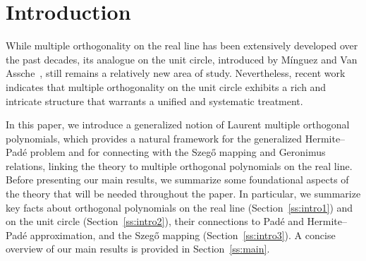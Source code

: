 \documentclass[reqno,centertags,11pt,draft]{amsart}
\newcommand{\blue}[1]{{\color{blue}#1}}
\begin{document}
\section{Introduction}

While multiple orthogonality on the real line has been extensively developed over the past decades, its analogue on the unit circle, introduced by M\'{i}nguez and Van Assche~\cite{MOPUC1}, still remains a relatively new area of study. Nevertheless, recent work~\cite{MOPUC2,KVMOPUC,KVMLOPUC1,KNik,HueMan} indicates that multiple orthogonality on the unit circle exhibits a rich and intricate structure that warrants a unified and systematic treatment.

In this paper, we introduce a generalized notion of Laurent multiple orthogonal polynomials, which provides a natural framework for the generalized Hermite--Pad\'{e} problem and for connecting with the Szeg\H{o} mapping and Geronimus relations, linking the theory to multiple orthogonal polynomials on the real line. Before presenting our main results, we summarize some foundational aspects of the theory that will be needed throughout the paper. In particular, we summarize key facts about orthogonal polynomials on the real line (Section~\ref{ss:intro1}) and on the unit circle  (Section~\ref{ss:intro2}), their connections to Pad\'e and Hermite--Pad\'e approximation, and the Szeg\H{o} mapping  (Section~\ref{ss:intro3}). A concise overview of our main results is provided in Section~\ref{ss:main}.







\end{document}
